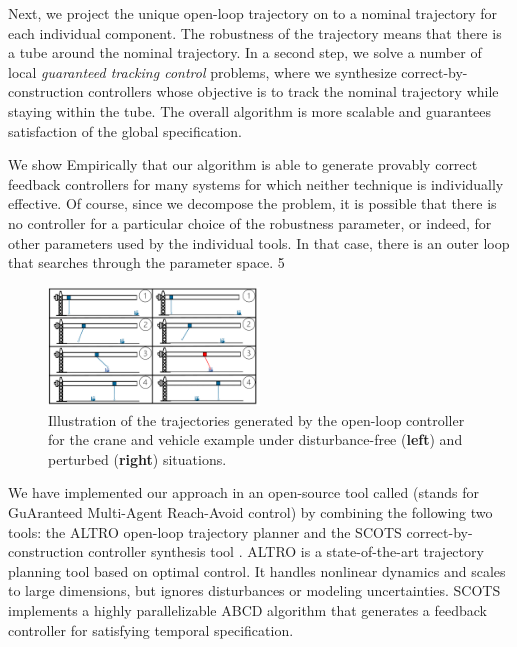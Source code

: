 Next, we project the unique open-loop trajectory on to a nominal trajectory for each individual component.
The robustness of the trajectory means that there is a tube around the nominal trajectory.
In a second step, we solve a number of local \emph{guaranteed tracking control} problems, where we synthesize correct-by-construction
controllers whose objective is to track the nominal trajectory while staying within the tube.
The overall algorithm is more scalable and guarantees satisfaction of the global specification.

We show Empirically that our algorithm is able to generate provably correct feedback controllers for many
systems for which neither technique is individually effective.
Of course, since we decompose the problem, it is possible that there is no controller for a particular choice of the
robustness parameter, or indeed, for other parameters used by the individual tools.
In that case, there is an outer loop that searches through the parameter space.
5
\begin{figure}[t]
	\centering
	\includegraphics[width=0.5\textwidth]{figures/updated_crane.pdf}
	\caption{Illustration of the trajectories generated by the open-loop controller for the crane and vehicle example under disturbance-free (\textbf{left}) and perturbed (\textbf{right}) situations.}
	\label{fig:cr_and_lft}
\end{figure}

We have implemented our approach in an open-source tool called \tool (stands for GuAranteed Multi-Agent Reach-Avoid control)
by combining the following two tools: the ALTRO open-loop trajectory planner \cite{howell2019altro} and the 
SCOTS correct-by-construction controller synthesis tool \cite{Rungger2016scots}. 
ALTRO is a state-of-the-art trajectory planning tool based on optimal control.
It handles nonlinear dynamics and scales to large dimensions, but ignores disturbances or modeling uncertainties.
SCOTS implements a highly parallelizable ABCD algorithm that generates a feedback controller for satisfying temporal specification.

